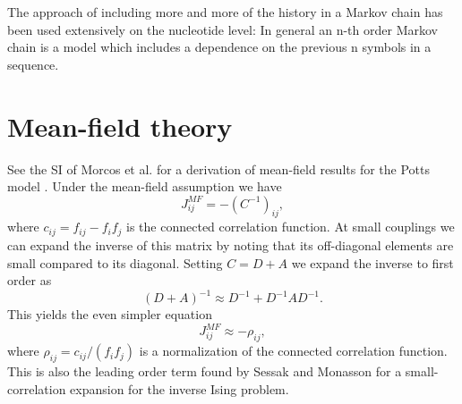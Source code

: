 \documentclass[superscriptaddress,onecolumn,pre]{revtex4}
\newcommand{\<}{\langle}
\renewcommand{\>}{\rangle}
\begin{document}
The approach of including more and more of the history in a Markov chain has been used extensively on the nucleotide level: In general an n-th order Markov chain is a model which includes a dependence on the previous n symbols in a sequence.

\section{Mean-field theory}

See the SI of Morcos et al. for a derivation of mean-field results for the Potts model \cite{Morcos2011}. Under the mean-field assumption we have 
\begin{equation}
    J_{ij}^{MF} = - (C^{-1})_{ij}, 
\end{equation}
where $c_{ij} = f_{ij} - f_i f_j$ is the connected correlation function. At small couplings we can expand the inverse of this matrix by noting that its off-diagonal elements are small compared to its diagonal. Setting $C = D + A$ we expand the inverse to first order as
\begin{equation}
    (D+A)^{-1} \approx D^{-1} + D^{-1} A D^{-1}. 
\end{equation}
This yields the even simpler equation
\begin{equation}
    J_{ij}^{MF} \approx - \rho_{ij},
\end{equation}
where $\rho_{ij} = c_{ij}/(f_i f_j)$ is a normalization of the connected correlation function. This is also the leading order term found by Sessak and Monasson for a small-correlation expansion for the inverse Ising problem.


\end{document}
